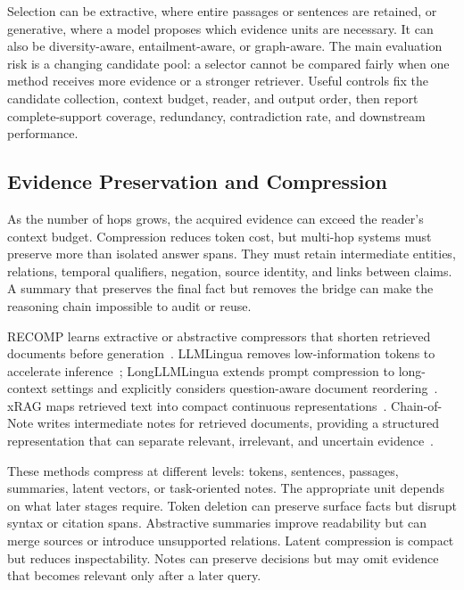 Selection can be extractive, where entire passages or sentences are retained, or generative, where a model proposes which evidence units are necessary. It can also be diversity-aware, entailment-aware, or graph-aware. The main evaluation risk is a changing candidate pool: a selector cannot be compared fairly when one method receives more evidence or a stronger retriever. Useful controls fix the candidate collection, context budget, reader, and output order, then report complete-support coverage, redundancy, contradiction rate, and downstream performance.

\subsection{Evidence Preservation and Compression}
\label{subsec:evidence_compression}

As the number of hops grows, the acquired evidence can exceed the reader's context budget. Compression reduces token cost, but multi-hop systems must preserve more than isolated answer spans. They must retain intermediate entities, relations, temporal qualifiers, negation, source identity, and links between claims. A summary that preserves the final fact but removes the bridge can make the reasoning chain impossible to audit or reuse.

RECOMP learns extractive or abstractive compressors that shorten retrieved documents before generation~\cite{xu2023recomp}. LLMLingua removes low-information tokens to accelerate inference~\cite{jiang2023llmlingua}; LongLLMLingua extends prompt compression to long-context settings and explicitly considers question-aware document reordering~\cite{jiang2023longllmlingua}. xRAG maps retrieved text into compact continuous representations~\cite{cheng2024xrag}. Chain-of-Note writes intermediate notes for retrieved documents, providing a structured representation that can separate relevant, irrelevant, and uncertain evidence~\cite{yu2023chainofnote}.

These methods compress at different levels: tokens, sentences, passages, summaries, latent vectors, or task-oriented notes. The appropriate unit depends on what later stages require. Token deletion can preserve surface facts but disrupt syntax or citation spans. Abstractive summaries improve readability but can merge sources or introduce unsupported relations. Latent compression is compact but reduces inspectability. Notes can preserve decisions but may omit evidence that becomes relevant only after a later query.

